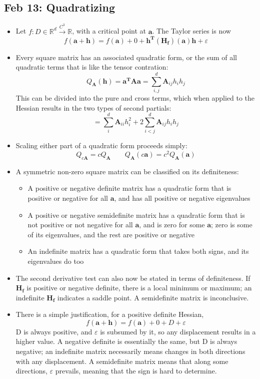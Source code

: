 \documentclass[10pt, oneside]{article}
\let\ep\varepsilon
\newcommand{\R}{\mathbb{R}}
\renewcommand{\vec}[1]{\mathbf{#1}}
\newcommand{\mat}[1]{\mathbf{#1}}
\begin{document}
\subsection{Feb 13: Quadratizing}
\begin{itemize}
    \item Let $f: D \in \R^d \overset{C^3}{\rightarrow} \R$, with a critical point at $\vec{a}$. The Taylor series is now
        \[f(\vec{a}+\vec{h}) = f(\vec{a}) + 0 + \vec{h^T}(\mat{H_f})(\vec{a})\vec{h} + \ep \]
    \item Every square matrix has an associated quadratic form, or the sum of all quadratic terms that is like the tensor contration: 
        \[Q_\mat{A}(\vec{h}) = \vec{a^T}\mat{A}\vec{a} = \sum_{i,j}^d \mat{A}_{ij} h_i h_j\]
    This can be divided into the pure and cross terms, which when applied to the Hessian results in the two types of second partials:
        \[= \sum_{i}^d \mat{A}_{ii} h_i^2 + 2 \sum_{i<j}^d \mat{A}_{ij} h_i h_j\]
    \item Scaling either part of a quadratic form proceeds simply:
        \[Q_{c\mat{A}} = cQ_\mat{A} \quad \quad Q_\mat{A} (c\vec{a}) = c^2 Q_\mat{A} (\vec{a})\]
    \item A symmetric non-zero square matrix can be classified on its definiteness:
        \begin{itemize}
            \item A positive or negative definite matrix has a quadratic form that is positive or negative for all $\vec{a}$, and has all positive or negative eigenvalues
            \item A positive or negative semidefinite matrix has a quadratic form that is not positive or not negative for all $\vec{a}$, and is zero for some $\vec{a}$; zero is some of its eigenvalues, and the rest are positive or negative
            \item An indefinite matrix has a quadratic form that takes both signs, and its eigenvalues do too
        \end{itemize}
    \item The second derivative test can also now be stated in terms of definiteness. If $\mat{H_f}$ is positive or negative definite, there is a local minimum or maximum; an indefinite $\mat{H_f}$ indicates a saddle point. A semidefinite matrix is inconclusive.
    \item There is a simple justification, for a positive definite Hessian,
        \[f(\vec{a} + \vec{h}) = f(\vec{a}) + 0 + D + \ep\]
        D is always positive, and $\ep$ is subsumed by it, so any displacement results in a higher value. A negative definite is essentially the same, but D is always negative; an indefinite matrix necessarily means changes in both directions with any displacement. A semidefinite matrix means that along some directions, $\ep$ prevails, meaning that the sign is hard to determine.
\end{itemize}
\end{document}
